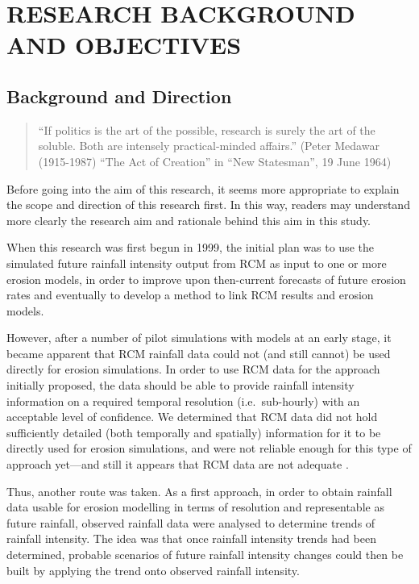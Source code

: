 \chapter{RESEARCH BACKGROUND AND OBJECTIVES}
\label{sec:RESEARCHOBJECTIVES}

\section{Background and Direction}
\label{sec:ResearchBackgroundandDirection}

\begin{quotation}
\small ``If politics is the art of the possible, research is surely the art of
the soluble. Both are intensely practical-minded affairs.'' (Peter Medawar
(1915-1987) ``The Act of Creation'' in ``New Statesman'', 19 June 1964)
\end{quotation}

Before going into the aim of this research, it seems more appropriate to explain
the scope and direction of this research first. In this way, readers may
understand more clearly the research aim and rationale behind this aim in this
study.

When this research was first begun in 1999, the initial plan was to use the
simulated future rainfall intensity output from RCM as input to one or more
erosion models, in order to improve upon then-current forecasts of future
erosion rates and eventually to develop a method to link RCM results and erosion
models.

However, after a number of pilot simulations with models at an early stage, it
became apparent that RCM rainfall data could not (and still cannot) be used
directly for erosion simulations. In order to use RCM data for the approach
initially proposed, the data should be able to provide rainfall intensity
information on a required temporal resolution (i.e.\ sub-hourly) with an
acceptable level of confidence. We determined that RCM data did not hold
sufficiently detailed (both temporally and spatially) information for it to
be directly used for erosion simulations, and were not
reliable enough for this type of approach yet---and still it appears that
RCM data are not adequate
\citep{nearing2001-229,michael2005-155,o'neal2005-165}.

Thus, another route was taken. As a first approach, in order to obtain
rainfall data usable for erosion modelling in terms of resolution and
representable as future rainfall, observed rainfall data were analysed to
determine trends of rainfall intensity. The idea was that once rainfall
intensity trends had been determined, probable scenarios of future rainfall
intensity changes could then be built by applying the trend onto observed
rainfall intensity.

